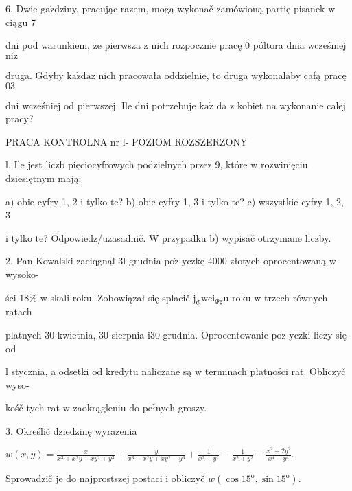 \documentclass[a4paper,12pt]{article}
\begin{document}
6. Dwie $\mathrm{g}\mathrm{a}\acute{\mathrm{z}}$dziny, pracując razem, mogą wykonač zamówioną partię pisanek $\mathrm{w}$ ciągu 7

dni pod warunkiem, $\dot{\mathrm{z}}\mathrm{e}$ pierwsza $\mathrm{z}$ nich rozpocznie pracę $0$ póltora dnia wcześniej $\mathrm{n}\mathrm{i}\dot{\mathrm{z}}$

druga. Gdyby $\mathrm{k}\mathrm{a}\dot{\mathrm{z}}\mathrm{d}\mathrm{a}\mathrm{z}$ nich pracowała oddzielnie, to druga wykonalaby cafą pracę $03$

$\mathrm{d}\mathrm{n}\mathrm{i}$ wcześniej od pierwszej. Ile $\mathrm{d}\mathrm{n}\mathrm{i}$ potrzebuje $\mathrm{k}\mathrm{a}\dot{\mathrm{z}}$ da $\mathrm{z}$ kobiet na wykonanie calej pracy?




PRACA KONTROLNA nr l- POZIOM ROZSZERZONY

l. Ile jest liczb pięciocyfrowych podzielnych przez 9, które $\mathrm{w}$ rozwinięciu dziesiętnym mają:

a) obie cyfry 1, 2 $\mathrm{i}$ tylko $\mathrm{t}\mathrm{e}$? b) obie cyfry 1, 3 $\mathrm{i}$ tylko $\mathrm{t}\mathrm{e}$? c) wszystkie cyfry 1, 2, 3

$\mathrm{i}$ tylko $\mathrm{t}\mathrm{e}$? Odpowiedz/uzasadnič. $\mathrm{W}$ przypadku b) wypisač otrzymane liczby.

2. Pan Kowalski zaciqgnąl 3l grudnia $\mathrm{p}\mathrm{o}\dot{\mathrm{z}}$ yczkę 4000 złotych oprocentowaną $\mathrm{w}$ wysoko-

ści 18\% $\mathrm{w}$ skali roku. Zobowiązał się splacič $\mathrm{j}_{\Phi}\mathrm{w}\mathrm{c}\mathrm{i}_{\Phi \mathrm{g}}\mathrm{u}$ roku $\mathrm{w}$ trzech równych ratach

platnych 30 kwietnia, 30 sierpnia $\mathrm{i}30$ grudnia. Oprocentowanie $\mathrm{p}\mathrm{o}\dot{\mathrm{z}}$ yczki liczy się od

l stycznia, a odsetki od kredytu naliczane są $\mathrm{w}$ terminach płatności rat. Obliczyč wyso-

kośč tych rat $\mathrm{w}$ zaokrągleniu do pełnych groszy.

3. Określič dziedzinę wyrazenia

$w(x,y)=\displaystyle \frac{x}{x^{3}+x^{2}y+xy^{2}+y^{3}}+\frac{y}{x^{3}-x^{2}y+xy^{2}-y^{3}}+\frac{1}{x^{2}-y^{2}}-\frac{1}{x^{2}+y^{2}}-\frac{x^{2}+2y^{2}}{x^{4}-y^{4}}.$

Sprowadzič je do najprostszej postaci $\mathrm{i}$ obliczyč $w(\cos 15^{\mathrm{o}},\sin 15^{\mathrm{o}}).$
\end{document}
